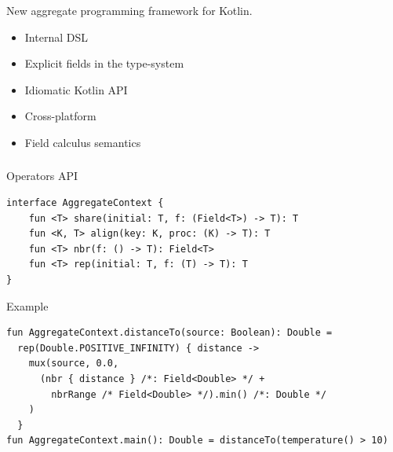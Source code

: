 \begin{frame}[fragile]
\frametitle{\Kotac}
\begin{block}{}
New aggregate programming framework for Kotlin.
\begin{itemize}
\item Internal DSL
\item Explicit fields in the type-system
\item Idiomatic Kotlin API
\item Cross-platform
\item Field calculus semantics
\end{itemize}
\end{block}
\end{frame}

\begin{frame}[fragile]
\frametitle{\Kotac}
\begin{block}{Operators API}
\begin{lstlisting}[language={kotac}]
interface AggregateContext {
    fun <T> share(initial: T, f: (Field<T>) -> T): T
    fun <K, T> align(key: K, proc: (K) -> T): T
    fun <T> nbr(f: () -> T): Field<T>
    fun <T> rep(initial: T, f: (T) -> T): T
}
\end{lstlisting}
\end{block}
\begin{block}{Example}
\begin{lstlisting}[language={kotac}]
fun AggregateContext.distanceTo(source: Boolean): Double =
  rep(Double.POSITIVE_INFINITY) { distance ->
    mux(source, 0.0, 
      (nbr { distance } /*: Field<Double> */ + 
        nbrRange /* Field<Double> */).min() /*: Double */
    )
  }
fun AggregateContext.main(): Double = distanceTo(temperature() > 10)
\end{lstlisting}
\end{block}
\end{frame}

